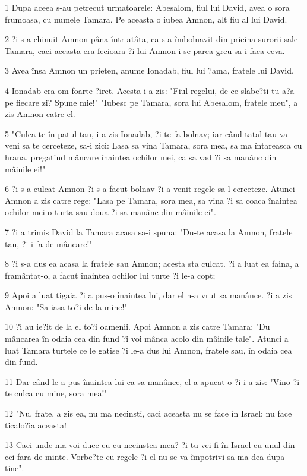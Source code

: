 \par 1 Dupa aceea s-au petrecut urmatoarele: Abesalom, fiul lui David, avea o sora frumoasa, cu numele Tamara. Pe aceasta o iubea Amnon, alt fiu al lui David.
\par 2 ?i s-a chinuit Amnon pâna într-atâta, ca s-a îmbolnavit din pricina surorii sale Tamara, caci aceasta era fecioara ?i lui Amnon i se parea greu sa-i faca ceva.
\par 3 Avea însa Amnon un prieten, anume Ionadab, fiul lui ?ama, fratele lui David.
\par 4 Ionadab era om foarte ?iret. Acesta i-a zis: "Fiul regelui, de ce slabe?ti tu a?a pe fiecare zi? Spune mie!" "Iubesc pe Tamara, sora lui Abesalom, fratele meu", a zis Amnon catre el.
\par 5 "Culca-te în patul tau, i-a zis Ionadab, ?i te fa bolnav; iar când tatal tau va veni sa te cerceteze, sa-i zici: Lasa sa vina Tamara, sora mea, sa ma întareasca cu hrana, pregatind mâncare înaintea ochilor mei, ca sa vad ?i sa manânc din mâinile ei!"
\par 6 ?i s-a culcat Amnon ?i s-a facut bolnav ?i a venit regele sa-l cerceteze. Atunci Amnon a zis catre rege: "Lasa pe Tamara, sora mea, sa vina ?i sa coaca înaintea ochilor mei o turta sau doua ?i sa manânc din mâinile ei".
\par 7 ?i a trimis David la Tamara acasa sa-i spuna: "Du-te acasa la Amnon, fratele tau, ?i-i fa de mâncare!"
\par 8 ?i s-a dus ea acasa la fratele sau Amnon; acesta sta culcat. ?i a luat ea faina, a framântat-o, a facut înaintea ochilor lui turte ?i le-a copt;
\par 9 Apoi a luat tigaia ?i a pus-o înaintea lui, dar el n-a vrut sa manânce. ?i a zis Amnon: "Sa iasa to?i de la mine!"
\par 10 ?i au ie?it de la el to?i oamenii. Apoi Amnon a zis catre Tamara: "Du mâncarea în odaia cea din fund ?i voi mânca acolo din mâinile tale". Atunci a luat Tamara turtele ce le gatise ?i le-a dus lui Amnon, fratele sau, în odaia cea din fund.
\par 11 Dar când le-a pus înaintea lui ca sa manânce, el a apucat-o ?i i-a zis: "Vino ?i te culca cu mine, sora mea!"
\par 12 "Nu, frate, a zis ea, nu ma necinsti, caci aceasta nu se face în Israel; nu face ticalo?ia aceasta!
\par 13 Caci unde ma voi duce eu cu necinstea mea? ?i tu vei fi în Israel cu unul din cei fara de minte. Vorbe?te cu regele ?i el nu se va împotrivi sa ma dea dupa tine".
